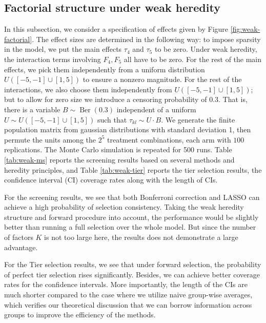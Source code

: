 \documentclass[12pt]{article}
\begin{document}
\subsection{Factorial structure under weak heredity}
In this subsection, we consider a specification of effects given by Figure \ref{fig:weak-factorial}. The effect sizes are determined in the following way: to impose sparsity in the model, we put the main effects $\tau_4$ and $\tau_{5}$ to be zero. Under weak heredity, the interaction terms involving $F_4,F_5$ all have to be zero.  For the rest of the main effects, we pick them independently from a uniform distribution $U([-5,-1]\cup [1,5])$ to ensure a nonzero magnitude. For the rest of the interactions,  we also choose them independently from $U([-5,-1]\cup [1,5])$; but to allow for zero size we introduce a censoring probability of $0.3$. That is, there is a variable $B\sim \operatorname{Ber}(0.3)$ independent of a uniform $U\sim U([-5,-1]\cup [1,5])$ such that $\tau_{kl}\sim U \cdot B$. We generate the finite population matrix from gaussian distributions with standard deviation 1, then permute the units among the $2^5$ treatment combinations, each arm with $100$ replications.  The Monte Carlo simulation is repeated for 500 runs.  Table \ref{tab:weak-ms} reports the  screening results based on several methods and heredity principles, and Table \ref{tab:weak-tier} reports the tier selection results, the confidence interval (CI) coverage rates along with the length of CIs. 

For the  screening results, we see that both Bonferroni correction and LASSO can achieve a high probability of selection consistency. Taking the weak heredity structure and forward procedure into account, the performance would be slightly better than running a full selection over the whole model. But since the number of factors $K$ is not too large here, the results does not demonstrate a large advantage.

For the Tier selection results, we see that under forward selection, the probability of perfect tier selection rises significantly. Besides, we can achieve better coverage rates for the confidence intervals. More importantly, the length of the CIs are much shorter compared to the case where we utilize naive group-wise averages, which verifies our theoretical discussion that we can borrow information across groups to improve the efficiency of the methods.
\end{document}

